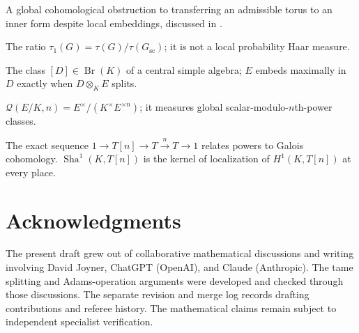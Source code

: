 \documentclass[11pt]{article}
\newcommand{\Sha}{\operatorname{Sha}}
\theoremstyle{plain}
\theoremstyle{definition}
\begin{document}
\begin{description}[style=nextline,leftmargin=2.7cm,labelwidth=2.5cm,font=\normalfont\bfseries]
\item[Kottwitz torus obstruction]
A global cohomological obstruction to transferring an admissible
torus to an inner form despite local embeddings, discussed in
\cite[\S9.5]{Kottwitz84}.
\item[Relative Tamagawa number]
The ratio $\tau_1(G)=\tau(G)/\tau(G_{\mathrm{sc}})$; it is not
a local probability Haar measure.
\item[Brauer class]
The class $[D]\in\operatorname{Br}(K)$ of a central simple algebra;
$E$ embeds maximally in $D$ exactly when $D\otimes_K E$ splits.
\item[Scalar power quotient]
$\mathcal Q(E/K,n)=E^\times/(K^\times E^{\times n})$;
it measures global scalar-modulo-$n$th-power classes.
\item[Kummer and $\Sha^1$]
The exact sequence $1\to T[n]\to T\xrightarrow{n}T\to1$
relates powers to Galois cohomology. $\Sha^1(K,T[n])$ is the
kernel of localization of $H^1(K,T[n])$ at every place.
\end{description}

\section*{Acknowledgments}
The present draft grew out of collaborative mathematical discussions and
writing involving David Joyner, ChatGPT (OpenAI), and Claude (Anthropic).
The tame splitting and Adams-operation arguments were developed and
checked through those discussions. The separate revision and merge log
records drafting contributions and referee history. The mathematical
claims remain subject to independent specialist verification.
\end{document}
